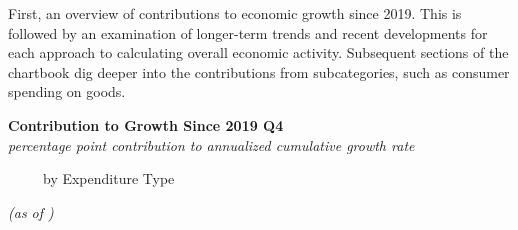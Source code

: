 \documentclass{report}
\newcommand{\bbar}[2]{extra #1 ticks = {{#2}}, extra #1 tick labels = ,
		extra #1 tick style = {grid=major, grid style={thick, black!25}},}
\newcommand{\barplotnogrid}{xbar=0pt, axis line style={draw=none},
	    yticklabel style={align=left, anchor=east},
      		xmajorticks=false, ymajorgrids=false,   
	    ytick=data, tickwidth=0pt, area legend, reverse legend,
	    nodes near coords align={horizontal},}
\begin{document}
\begin{minipage}{0.76\textwidth}
First, an overview of contributions to economic growth since 2019. This is followed by an examination of longer-term trends and recent developments for each approach to calculating overall economic activity. Subsequent sections of the chartbook dig deeper into the contributions from subcategories, such as consumer spending on goods. 
\end{minipage}
\vspace{1mm}

\normalsize \textbf{Contribution to Growth Since 2019 Q4}\\
\footnotesize{\textit{percentage point contribution to annualized cumulative growth rate}}
\vspace{0.5mm}

\begin{minipage}{0.26\textwidth}
\normalsize \ \ \ \ \ by Expenditure Type
\vspace*{-2.5mm}

\hspace{10mm} \footnotesize \textit{(as of \unskip)}
\vspace{4.2cm}

\hspace{2mm}
  \end{minipage}\hspace{5mm}
\end{document}
